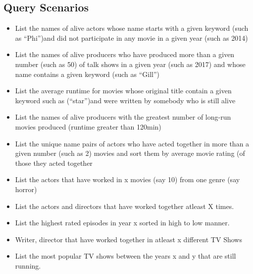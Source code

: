 \documentclass{sig-alternate}
\begin{document}
	\subsection{Query Scenarios}
	\begin{itemize}
		\item List the names of alive actors whose name starts with a given keyword (such as “Phi”)and did not participate in any movie in a given year (such as 2014)
		\item List the names of alive producers who have produced more than a given number (such as 50) of talk  shows in a  given  year  (such  as 2017) and  whose  name contains  a  given  keyword  (such  as “Gill”)
		\item List the average runtime for movies whose original title contain a given keyword such as (“star”)and were written by somebody who is still alive
		\item List the names of alive producers with the greatest number of long-run movies produced (runtime greater than 120min)
		\item List the unique name pairs of actors who have acted together in more than a given number (such as 2)  movies and sort them by average movie rating (of those they acted together
		\item List the actors that have worked in x movies (say 10) from one genre (say horror)
		\item List the actors and directors that have worked together atleast X times.
		\item List the highest rated episodes in year x sorted in high to low manner.
		\item Writer, director that have worked together in atleast x different TV Shows
		\item List the most popular TV shows between the years x and y that are still running.
	\end{itemize}
	
	
\end{document}

